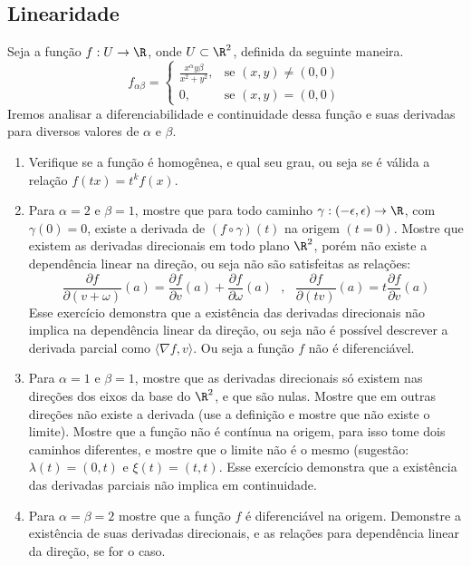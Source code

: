 \subsection{Linearidade}

Seja a função $f:U\to\R$, onde $U\subset \R^2$, definida da seguinte maneira.
%
%
\[
  f_{\alpha\beta} =
  \begin{cases}
    \frac{x^\alpha y\beta}{x^2+y^2} ,& \text{se $(x,y) \neq (0,0)$}\\
    0                               ,& \text{se $(x,y) = (0,0)$}
  \end{cases}
\]
%
%
Iremos analisar a diferenciabilidade e continuidade dessa função e suas derivadas para diversos valores de $\alpha$ e $\beta$.
%
%
%
\begin{enumerate}
  \item Verifique se a função é homogênea, e qual seu grau, ou seja se é válida a relação $f(tx) = t^kf(x)$. 
	\item Para $\alpha = 2$ e $\beta = 1$, mostre que para todo caminho $\gamma:(-\epsilon,\epsilon) \to \R$, com $\gamma(0) = 0$, existe a derivada de $(f\circ\gamma)(t)$ na origem $(t=0)$. Mostre que existem as derivadas direcionais em todo plano $\R^2$, porém não existe a dependência linear na direção, ou seja não são satisfeitas as relações:
	\[ 
	\frac{\partial f}{\partial (v+\omega)}(a) = \frac{\partial f}
	{\partial v}(a) + \frac{\partial f}{\partial \omega}(a)
	\ \ \ , \ \ \
	\frac{\partial f}{\partial(t v)}(a) = t \frac{\partial f}
	{\partial v}(a)
	\]
	Esse exercício demonstra que a existência das derivadas direcionais não implica na dependência linear da direção, ou seja não é possível descrever a derivada parcial como $\langle \nabla f, v \rangle$. Ou seja a função $f$ não é diferenciável.
	\item Para $\alpha = 1$ e $\beta = 1$, mostre que as derivadas direcionais só existem nas direções dos eixos da base do $\R^2$, e que são nulas. Mostre que em outras direções não existe a derivada (use a definição e mostre que não existe o limite). Mostre que a função não é contínua na origem, para isso tome dois caminhos diferentes, e mostre que o limite 
	não é o mesmo (sugestão: $\lambda(t) = (0,t)$ e $\xi(t) = (t,t)$. Esse exercício demonstra que a existência das derivadas parciais não implica em continuidade.
	\item Para $\alpha = \beta = 2$ mostre que a função $f$ é diferenciável 
	na origem. Demonstre a existência de suas derivadas direcionais, e as relações para dependência linear da direção, se for o caso.

\end{enumerate}
